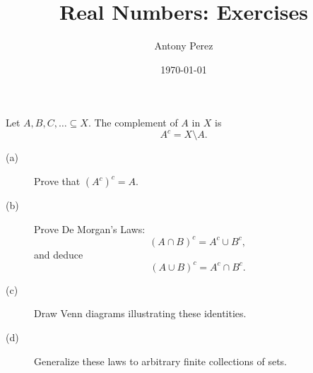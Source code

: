 \documentclass[11pt]{article}
\title{Real Numbers: Exercises}
\author{Antony Perez}
\date{\today}
\begin{document}
\maketitle


\begin{exercise}
Let $A,B,C,\ldots\subseteq X$. The complement of $A$ in $X$ is
\[
A^c=X\setminus A.
\]

\begin{description}
\item[(a)] Prove that $(A^c)^c=A$.

\item[(b)] Prove De Morgan's Laws:
\[
(A\cap B)^c=A^c\cup B^c,
\]
and deduce
\[
(A\cup B)^c=A^c\cap B^c.
\]

\item[(c)] Draw Venn diagrams illustrating these identities.

\item[(d)] Generalize these laws to arbitrary finite collections of sets.
\end{description}
\end{exercise}
\end{document}
